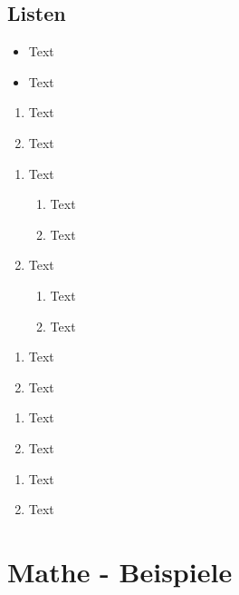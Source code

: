 \newpage

\subsection{Listen}\label{sec:listen}

\begin{itemize}%
	\item Text
	\item Text
\end{itemize}

\begin{enumerate}%
	\item Text
	\item Text
\end{enumerate}

\begin{enumerate}%
	\item Text
	\begin{enumerate}%
		\item Text
		\item Text
	\end{enumerate}%
	\item Text
	\begin{enumerate}%
		\item Text
		\item Text
	\end{enumerate}
\end{enumerate}

\begin{enumerate}[label=(\roman*)]%
	\item Text
	\item Text
\end{enumerate}

\begin{enumerate}[label={\arabic*\alph*)}]%
	\item Text
	\item Text
\end{enumerate}

\begin{enumerate}[label=\bfseries Punkt \Roman*]%
	\item Text
	\item Text
\end{enumerate}

\section{Mathe - Beispiele}\label{mathe-bsp}

